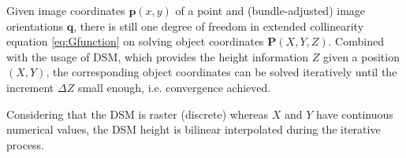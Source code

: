 Given image coordinates $\mathbf{p}(x,y)$ of a point and (bundle-adjusted) image orientations $\mathbf{q}$, there is still one degree of freedom in extended collinearity equation \eqref{eq:Gfunction} on solving object coordinates $\mathbf{P}(X,Y,Z)$. Combined with the usage of DSM, which provides the height information $Z$ given a position $(X,Y)$, the corresponding object coordinates can be solved iteratively until the increment $\Delta Z$ small enough, i.e. convergence achieved. %

Considering that the DSM is raster (discrete) whereas $X$ and $Y$ have continuous numerical values, the DSM height is bilinear interpolated during the iterative process.






















